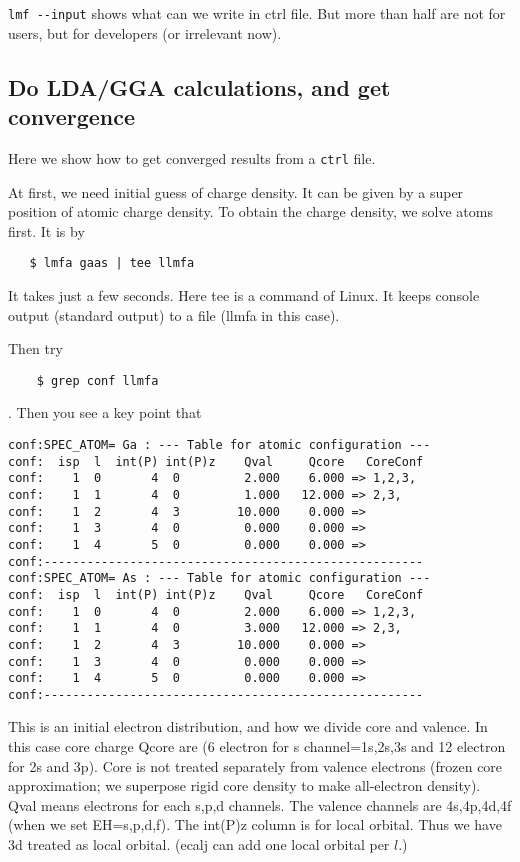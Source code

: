 \documentclass[a4paper,10pt,epsf,fleqn]{article}
\begin{document}
\verb+lmf --input+ shows what can we write in ctrl file.
But more than half are not for users, but for developers 
(or irrelevant now).
 

\subsection{Do LDA/GGA calculations, and get convergence}
\label{lm7K-scf}
Here we show how to get converged results from a \verb+ctrl+ file.

At first, we need initial guess of charge density.
It can be given by a super position of atomic charge density.
To obtain the charge density, we solve atoms first. It is by
\begin{verbatim}
   $ lmfa gaas | tee llmfa
\end{verbatim}
It takes just a few seconds. Here tee is a command of Linux.
It keeps console output (standard output) to a file (llmfa in this case).

Then try
\begin{verbatim}
    $ grep conf llmfa
\end{verbatim}
. Then you see a key point that
\begin{verbatim}
conf:SPEC_ATOM= Ga : --- Table for atomic configuration ---
conf:  isp  l  int(P) int(P)z    Qval     Qcore   CoreConf
conf:    1  0       4  0         2.000    6.000 => 1,2,3,
conf:    1  1       4  0         1.000   12.000 => 2,3,
conf:    1  2       4  3        10.000    0.000 => 
conf:    1  3       4  0         0.000    0.000 => 
conf:    1  4       5  0         0.000    0.000 => 
conf:-----------------------------------------------------
conf:SPEC_ATOM= As : --- Table for atomic configuration ---
conf:  isp  l  int(P) int(P)z    Qval     Qcore   CoreConf
conf:    1  0       4  0         2.000    6.000 => 1,2,3,
conf:    1  1       4  0         3.000   12.000 => 2,3,
conf:    1  2       4  3        10.000    0.000 => 
conf:    1  3       4  0         0.000    0.000 => 
conf:    1  4       5  0         0.000    0.000 => 
conf:-----------------------------------------------------
\end{verbatim}
This is an initial electron distribution, and how we divide 
core and valence. In this case core charge Qcore are (6 electron for s channel=1s,2s,3s
and 12 electron for 2s and 3p). Core is not treated separately from valence electrons
(frozen core approximation; we superpose rigid core density to make
all-electron density). Qval means electrons for each s,p,d channels.
The valence channels are 4s,4p,4d,4f (when we set EH=s,p,d,f). 
The int(P)z column is for local orbital. Thus we have 3d treated as
local orbital. (ecalj can add one local orbital per $l$.)
\end{document}
